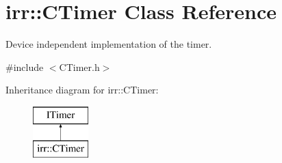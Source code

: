 \hypertarget{classirr_1_1_c_timer}{\section{irr\-:\-:C\-Timer Class Reference}
\label{classirr_1_1_c_timer}
}


Device independent implementation of the timer.  




{\ttfamily \#include $<$C\-Timer.\-h$>$}

Inheritance diagram for irr\-:\-:C\-Timer\-:\begin{figure}[H]
\begin{center}
\leavevmode
\includegraphics[height=2.000000cm]{classirr_1_1_c_timer}
\end{center}
\end{figure}
